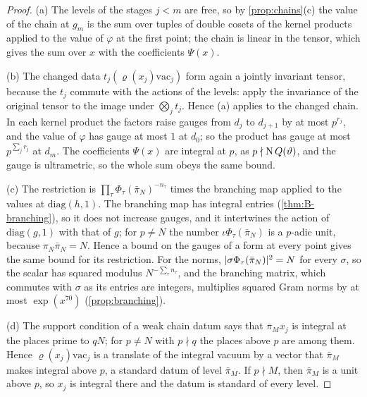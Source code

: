 \begin{proof}
(a) The levels of the stages $j<m$ are free, so by \cref{prop:chains}(c) the value of the chain at $g_m$ is the sum over tuples of double cosets of the kernel products applied to the value of $\varphi$ at the first point; the chain is linear in the tensor, which gives the sum over $x$ with the coefficients $\Psi(x)$.

(b) The changed data $t_j(\varrho(x_j)\mathrm{vac}_j)$ form again a jointly invariant tensor, because the $t_j$ commute with the actions of the levels: apply the invariance of the original tensor to the image under $\bigotimes_jt_j$. Hence (a) applies to the changed chain. In each kernel product the factors raise gauges from $d_j$ to $d_{j+1}$ by at most $p^{r_j}$, and the
value of $\varphi$ has gauge at most $1$ at $d_0$; so the product has gauge at most $p^{\sum_jr_j}$ at $d_m$. The coefficients $\Psi(x)$ are integral at $p$, as $p\nmid\operatorname{N} Q(\vartheta)$, and the gauge is ultrametric, so the whole sum obeys the same bound.

(c) The restriction is $\prod_\tau\Phi_\tau(\bar\pi_N)^{-n_\tau}$ times the branching map applied to the values at $\mathrm{diag}(h,1)$. The branching map has integral entries (\cref{thm:B-branching}), so it does not increase gauges, and it intertwines the action of $\mathrm{diag}(g,1)$ with that of $g$; for $p\ne N$ the number $\iota\Phi_\tau(\bar\pi_N)$ is a $p$-adic unit,
because $\pi_N\bar\pi_N=N$. Hence a bound on the gauges of a form at every point gives the same bound for its restriction. For the norms, $\lvert \sigma\Phi_\tau(\bar\pi_N)\rvert^2=N$ for every $\sigma$, so the scalar has squared modulus $N^{-\sum_\tau n_\tau}$, and the branching matrix, which commutes with $\sigma$ as its entries are integers, multiplies squared Gram norms by at
most $\exp(x^{70})$ (\cref{prop:branching}).

(d) The support condition of a weak chain datum says that $\bar\pi_Mx_j$ is integral at the places prime to $qN$; for $p\ne N$ with $p\nmid q$ the places above $p$ are among them. Hence $\varrho(x_j)\mathrm{vac}_j$ is a translate of the integral vacuum by a vector that $\bar\pi_M$ makes integral above $p$, a standard datum of level $\bar\pi_M$. If $p\nmid M$, then
$\bar\pi_M$ is a unit above $p$, so $x_j$ is integral there and the datum is standard of every level.
\end{proof}

